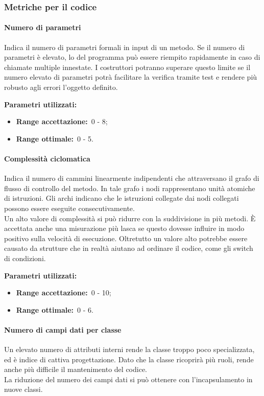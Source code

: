		\subsubsection{Metriche per il codice}		
			\label{sec:3.7.3}
			\paragraph{Numero di parametri}
				\label{sec:3.7.3.1}
				Indica il numero di parametri formali in input di un metodo. Se il numero di parametri è elevato, lo  del programma può essere riempito rapidamente in caso di chiamate multiple innestate. I costruttori potranno superare questo limite se il numero elevato di parametri potrà facilitare la verifica tramite test e rendere più robusto agli errori l'oggetto definito.
				
				\textbf{Parametri utilizzati:}
				\begin{itemize}
					\item \textbf{Range accettazione:}\ 0 - 8;
					\item \textbf{Range ottimale:}\ 0 - 5.
				\end{itemize}
			\paragraph{Complessità ciclomatica}
				\label{sec:3.7.3.2}
				Indica il numero di cammini linearmente indipendenti che attraversano il grafo di flusso di controllo del metodo. In tale grafo i nodi rappresentano unità atomiche di istruzioni. Gli archi indicano che le istruzioni collegate dai nodi collegati possono essere eseguite consecutivamente. \\
				Un alto valore di complessità si può ridurre con la suddivisione in più metodi. È accettata anche una misurazione più lasca se questo dovesse influire in modo positivo sulla velocità di esecuzione. Oltretutto un valore alto potrebbe essere causato da strutture che in realtà aiutano ad ordinare il codice, come gli switch di condizioni.
				
				\textbf{Parametri utilizzati:}
				\begin{itemize}
					\item \textbf{Range accettazione:}\ 0 - 10;
					\item \textbf{Range ottimale:}\ 0 - 6.
				\end{itemize}
			\paragraph{Numero di campi dati per classe}
				\label{sec:3.7.3.3}
				Un elevato numero di attributi interni rende la classe troppo poco specializzata, ed è indice di cattiva progettazione. Dato che la classe ricoprirà più ruoli, rende anche più difficile il mantenimento del codice. \\
				La riduzione del numero dei campi dati si può ottenere con l'incapsulamento in nuove classi.
				
